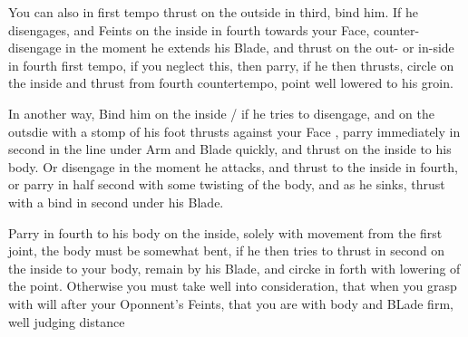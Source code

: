 You can also in first tempo thrust on the outside in third, bind
him. If he disengages, and Feints on the inside in fourth towards your
Face, counter-disengage in the moment he extends his Blade, and thrust
on the out- or in-side in fourth first tempo, if you neglect this,
then parry, if he then thrusts, circle on the inside and thrust from
fourth countertempo, point well lowered to his groin.


In another way, Bind him on the inside / if he tries to disengage, and
on the outsdie with a stomp of his foot thrusts against your Face ,
parry immediately in second in the line under Arm and Blade quickly,
and thrust on the inside to his body. Or disengage in the moment he
attacks, and thrust to the inside in fourth, or parry in half second
with some twisting of the body, and as he sinks, thrust with a bind in
second under his Blade.


Parry in fourth to his body on the inside, solely with movement from
the first joint, the body must be somewhat bent, if he then tries to
thrust in second on the inside to your body, remain by his Blade, and
circke in forth with lowering of the point. Otherwise you must take
well into consideration, that when you grasp with will after your
Oponnent's Feints, that you are with body and BLade firm, well judging distance
